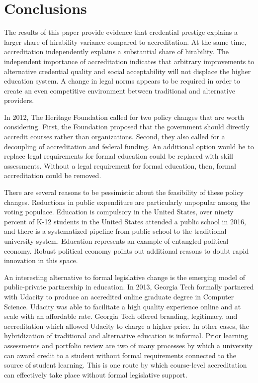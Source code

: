 \documentclass[review]{elsarticle}
\begin{document}
\section{Conclusions}

The results of this paper provide evidence that credential prestige explains a larger share
of hirability variance compared to accreditation.
At the same time, accreditation independently explains a substantial share of hirability.
The independent importance of accreditation indicates that arbitrary improvements to alternative credential
quality and social acceptability will not displace the higher education system.
A change in legal norms appears to be required in order to create an even competitive environment between traditional and alternative providers.

In 2012, The Heritage Foundation called for two policy changes that are worth considering.
First, the Foundation proposed that the government should directly accredit courses rather than organizations\cite{burke2012accreditation}.
Second, they also called for a decoupling of accreditation and federal funding.
An additional option would be to replace legal requirements for formal education could be replaced with skill assessments.
Without a legal requirement for formal education, then, formal accreditation could be removed.

There are several reasons to be pessimistic about the feasibility of these policy changes.
Reductions in public expenditure are particularly unpopular among the voting populace.
Education is compulsory in the United States,
over ninety percent of K-12 students in the United States attended a public school in 2016\cite{us2019digest},
and there is a systematized pipeline from public school to the traditional university system.
Education represents an example of entangled political economy\cite{wagner2014entangled}.
Robust political economy points out additional reasons to doubt rapid innovation in this space\cite{boettke2004liberalism}.

An interesting alternative to formal legislative change is the emerging model of public-private partnership in education.
In 2013, Georgia Tech formally partnered with Udacity to produce an accredited online graduate degree in Computer Science\cite{empson_2013}.
Udacity was able to facilitate a high quality experience online and at scale with an affordable rate.
Georgia Tech offered branding, legitimacy, and accreditation which allowed Udacity to charge a higher price.
In other cases, the hybridization of traditional and alternative education is informal.
Prior learning assessments and portfolio review are two of many processes by which a university can award credit to a student
without formal requirements connected to the source of student learning\cite{conrad2008building}.
This is one route by which course-level accreditation can effectively take place without formal legislative support.
\end{document}
